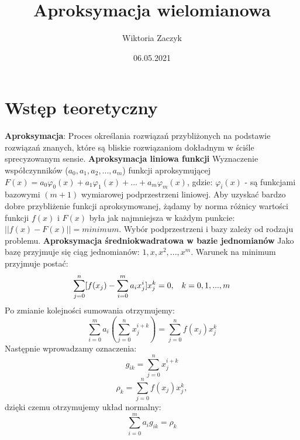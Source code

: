 \documentclass{article}
\title{Aproksymacja wielomianowa}
\author{Wiktoria Zaczyk}
\date{06.05.2021}
\begin{document}
\maketitle

\section{Wstęp teoretyczny}

\newline\newline
\textbf{Aproksymacja}:
\newline
Proces określania rozwiązań przybliżonych na podstawie rozwiązań 
znanych, które są bliskie rozwiązaniom dokładnym w ściśle sprecyzowanym sensie.
\newline\newline
\textbf{Aproksymacja liniowa funkcji}
\newline
Wyznaczenie współczynników ($a_0,a_1,a_2,...,a_m$) 
funkcji aproksymującej $F(x)=a_0\varphi_0(x)+a_1\varphi_1(x)+...+ a_m\varphi_m(x) $, gdzie: $\varphi_i(x)$ - są funkcjami bazowymi $(m+1)$ wymiarowej podprzestrzeni liniowej. Aby uzyskać bardzo dobre przybliżenie funkcji aproksymowanej, żądamy by norma różnicy wartości funkcji $f(x)$ i $F(x)$ była jak najmniejsza w każdym punkcie: $||f(x)-F(x)||=minimum$. Wybór podprzestrzeni i bazy zależy od rodzaju problemu.
\newline\newline
\textbf{Aproksymacja średniokwadratowa w bazie jednomianów}
Jako bazę przyjmuje się ciąg jednomianów: $1, x, x^2, . . . , x^m$. Warunek na minimum przyjmuje postać:
\begin{equation}
\begin{array}{c c}
\displaystyle\sum_{j=0}^{n} [f(x_j) - \displaystyle\sum_{i=0}^{m} a_i x_j^i]x^k _j = 0, & k = 0, 1, . . . , m
\end{array}
\end{equation}
Po zmianie kolejności sumowania otrzymujemy:
\begin{equation}
\displaystyle\sum_{i=0}^{m} a_i (\displaystyle\sum_{j=0}^{n} x_j^{i+k} ) = \displaystyle\sum_{j=0}^{n} f(x_j) x_j ^ k
\end{equation}
Następnie wprowadzamy oznaczenia:
\begin{equation}
g_{ik} = \displaystyle\sum_{j=0}^{n} x_j^{i+k}
\end{equation}
\begin{equation}
\rho_{k} = \displaystyle\sum_{j=0}^{n} f(x_j) x_j ^ k,
\end{equation}
dzięki czemu otrzymujemy układ normalny:
\begin{equation}
\displaystyle\sum_{i=0}^{m} a_i g_{ik} = \rho _k
\end{equation}
\end{document}
